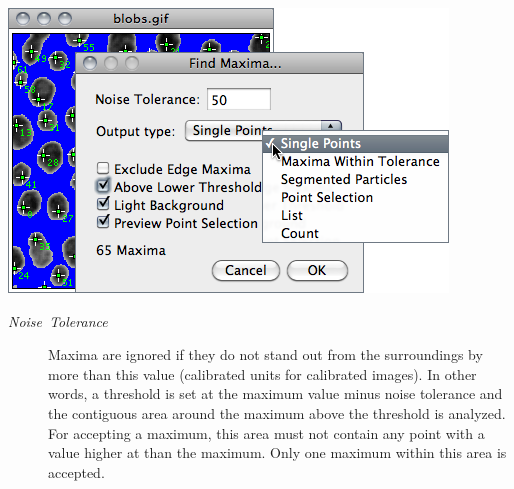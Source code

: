 \begin{minipage}[c][1\totalheight][t]{0.592\columnwidth}%
\includegraphics[scale=0.55]{images/FindMaxima}%
\end{minipage}%
\begin{minipage}[c][1\totalheight][t]{0.408\columnwidth}%
\begin{description}
\item [{\emph{Noise\ Tolerance}}] Maxima are ignored if they do not stand
out from the surroundings by more than this value (calibrated units
for calibrated images). In other words, a threshold is set at the
maximum value minus noise tolerance and the contiguous area around
the maximum above the threshold is analyzed. For accepting a maximum,
this area must not contain any point with a value higher at than the
maximum. Only one maximum within this area is accepted.\end{description}
%
\end{minipage}
